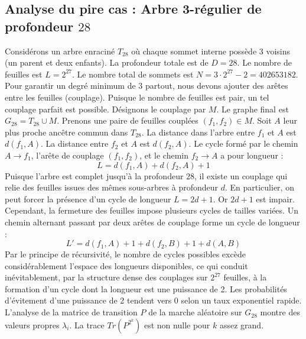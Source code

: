 \documentclass[11pt,a4paper]{article}
\begin{document}
\subsection{Analyse du pire cas : Arbre 3-régulier de profondeur $28$}
Considérons un arbre enraciné $T_28$ où chaque sommet interne possède 3 voisins (un parent et deux enfants).
La profondeur totale est de $D = 28$.
Le nombre de feuilles est $L = 2^{27}$.
Le nombre total de sommets est $N = 3 \cdot 2^{27} - 2 = 402653182$.
Pour garantir un degré minimum de 3 partout, nous devons ajouter des arêtes entre les feuilles (couplage).
Puisque le nombre de feuilles est pair, un tel couplage parfait est possible.
Désignons le couplage par $M$. Le graphe final est $G_28 = T_28 \cup M$.
Prenons une paire de feuilles couplées $(f_1, f_2) \in M$.
Soit $A$ leur plus proche ancêtre commun dans $T_28$.
La distance dans l'arbre entre $f_1$ et $A$ est $d(f_1, A)$.
La distance entre $f_2$ et $A$ est $d(f_2, A)$.
Le cycle formé par le chemin $A \to f_1$, l'arête de couplage $(f_1, f_2)$, et le chemin $f_2 \to A$ a pour longueur :
$$ L = d(f_1, A) + d(f_2, A) + 1 $$
Puisque l'arbre est complet jusqu'à la profondeur $28$, il existe un couplage qui relie des feuilles issues des mêmes sous-arbres à profondeur $d$.
En particulier, on peut forcer la présence d'un cycle de longueur $L = 2d + 1$. Or $2d+1$ est impair.
Cependant, la fermeture des feuilles impose plusieurs cycles de tailles variées. Un chemin alternant passant par deux arêtes de couplage forme un cycle de longueur :
$$ L' = d(f_1, A) + 1 + d(f_2, B) + 1 + d(A, B) $$
Par le principe de récursivité, le nombre de cycles possibles excède considérablement l'espace des longueurs disponibles, ce qui conduit inévitablement, par la structure dense des couplages sur $2^{27}$ feuilles, à la formation d'un cycle dont la longueur est une puissance de 2. Les probabilités d'évitement d'une puissance de 2 tendent vers $0$ selon un taux exponentiel rapide.
L'analyse de la matrice de transition $P$ de la marche aléatoire sur $G_28$ montre des valeurs propres $\lambda_i$. La trace $Tr(P^{2^k})$ est non nulle pour $k$ assez grand.
\end{document}
